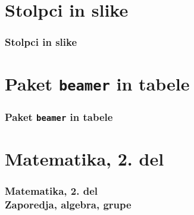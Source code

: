 \documentclass{beamer}
\begin{document}
\section{Stolpci in slike}
\begin{frame}

\frametitle{Stolpci in slike}
\end{frame}
\section{Paket \texttt{beamer} in tabele}
\begin{frame}

\frametitle{Paket \texttt{beamer} in tabele}
\end{frame}
\section[Matematika, 2. del\\\large{Zaporedja, algebra, grupe}]{Matematika, 2. del}
\begin{frame}

\frametitle{Matematika, 2. del\\\large{Zaporedja, algebra, grupe}}
\end{frame}
\end{document}
